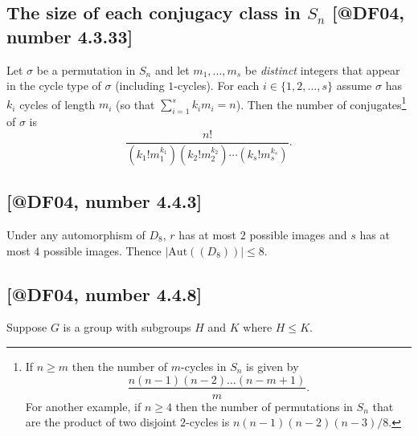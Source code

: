 \documentclass{humanist}
\let\subsubsection\subsection
\let\subsection\section
\let\section\chapter
\let\chapter\part
\providecommand{\abs}[1]{\left\lvert #1 \right\rvert}
\newcommand{\Stab}[2]{\mathrm{Stab}_{#1}\left( { #2 } \right)}
\providecommand{\tightlist}{%
\newcommand{\Stab}[2]{\mathrm{Stab}_{#1}\left( #2 \right)}
  \setlength{\itemsep}{0pt}\setlength{\parskip}{0pt}}
\begin{document}
\hypertarget{the-size-of-each-conjugacy-class-in-s_n-number-4.3.33df04-number-4.3.33}{%
\subsubsection{\texorpdfstring{The size of each conjugacy class in
\(S_n\) {[}@DF04, number
4.3.33{]}}{The size of each conjugacy class in S\_n , number 4.3.33{[}@DF04, number 4.3.33{]}}}\label{the-size-of-each-conjugacy-class-in-s_n-number-4.3.33df04-number-4.3.33}}

Let \(\sigma\) be a permutation in \(S_n\) and let \(m_1, \ldots, m_s\)
be \emph{distinct} integers that appear in the cycle type of \(\sigma\)
(including \(1\)-cycles). For each \(i \in \{1, 2, \ldots, s\}\) assume
\(\sigma\) has \(k_i\) cycles of length \(m_i\) (so that
\(\sum_{i=1}^s k_i m_i = n\)). Then the number of conjugates\footnote{If
  \(n \ge m\) then the number of \(m\)-cycles in \(S_n\) is given by
  \[\frac{n(n-1)(n-2)\ldots(n-m+1)}{m}.\] For another example, if
  \(n \ge 4\) then the number of permutations in \(S_n\) that are the
  product of two disjoint \(2\)-cycles is \(n(n-1)(n-2)(n-3)/8\).} of
\(\sigma\) is
\[\frac{n!}{(k_1!m_1^{k_1})(k_2!m_2^{k_2})\cdots(k_s!m_s^{k_s})}.\]

\hypertarget{number-4.4.3df04-number-4.4.3}{%
\subsubsection{\texorpdfstring{{[}@DF04, number
4.4.3{]}}{, number 4.4.3{[}@DF04, number 4.4.3{]}}}\label{number-4.4.3df04-number-4.4.3}}

Under any automorphism of \(D_8\), \(r\) has at most \(2\) possible
images and \(s\) has at most \(4\) possible images. Thence
\(\abs{\mathrm{Aut}\left({ (D_8) }\right)} \le 8\).

\hypertarget{number-4.4.8df04-number-4.4.8}{%
\subsubsection{\texorpdfstring{{[}@DF04, number
4.4.8{]}}{, number 4.4.8{[}@DF04, number 4.4.8{]}}}\label{number-4.4.8df04-number-4.4.8}}

Suppose \(G\) is a group with subgroups \(H\) and \(K\) where
\(H \le K\).

\end{document}
